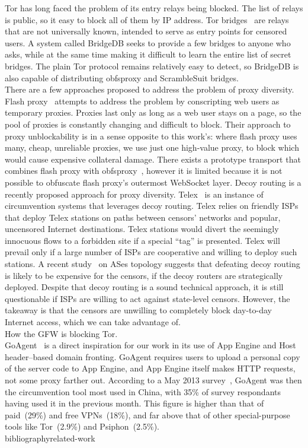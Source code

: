 \documentclass{article}  usepackage{url}
\begin{document}
Tor has long faced the problem of its entry relays being blocked. The list of
relays is public, so it easy to block all of them by IP address. Tor
bridges~\cite{tor-blocking} are relays that are not universally known, intended
to serve as entry points for censored users. A system called BridgeDB seeks to
provide a few bridges to anyone who asks, while at the same time making it
difficult to learn the entire list of secret bridges. The plain Tor protocol
remains relatively easy to detect, so BridgeDB is also capable of distributing
obfsproxy and ScrambleSuit bridges.\\

There are a few approaches proposed to address the problem of proxy diversity.
Flash proxy~\cite{flashproxy-pets12} attempts to address the problem  by
conscripting web users as temporary proxies. Proxies last only as long as a web
user stays on a page, so the pool of proxies is constantly changing and
difficult to block. Their approach to proxy unblockability is in a sense
opposite to this work's: where flash proxy uses many, cheap, unreliable proxies,
we use just one high-value proxy, to block which would cause expensive
collateral damage. There exists a prototype transport that combines flash proxy
with obfsproxy~\cite{obfs-flash}, however it is limited because it is not
possible to obfuscate flash proxy's outermost WebSocket layer. Decoy routing is
a recently proposed approach for proxy diversity. Telex~\cite{telex} is an
instance of circumvention systems that leverages decoy routing. Telex relies on
friendly ISPs that deploy Telex stations on paths between censors' networks and
popular, uncensored Internet destinations. Telex stations would divert the
seemingly  innocuous flows to a forbidden site if a special ``tag'' is
presented. Telex will prevail only if a large number of ISPs are cooperative and
willing to deploy such stations. A recent study~\cite{nodirectionhome} on ASes
topology suggests that defeating decoy routing is likely to be expensive for the
censors, if the decoy routers are strategically deployed. Despite that decoy
routing is a sound technical approach, it is still questionable if ISPs are
willing to act against state-level censors. However, the takeaway is that the
censors are unwilling to completely block day-to-day Internet access, which we
can take advantage of. \\

How the GFW is blocking Tor. \cite{foci12-winter}\\

GoAgent~\cite{goagent} is a direct inspiration for our work in its use of App
Engine and Host header--based domain fronting. GoAgent requires users to upload
a personal copy of the server code to App Engine, and App Engine itself makes
HTTP requests, not some proxy farther out. According to a May 2013 survey~\cite
{collateral-freedom}, GoAgent was then the circumvention tool most used in
China, with 35\% of survey respondants having used it in the previous month.
This figure is higher than that of paid~(29\%) and free VPNs~(18\%), and far
above that of other special-purpose tools like Tor~(2.9\%) and Psiphon~(2.5\%).
\\


  bibliography{related-work}
\end{document}
